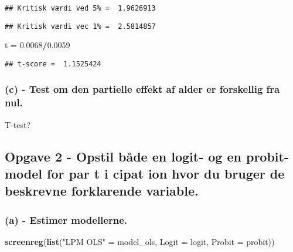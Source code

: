 \documentclass[
]{article}
\newenvironment{Shaded}{\begin{snugshade}}{\end{snugshade}}
\newcommand{\AttributeTok}[1]{\textcolor[rgb]{0.13,0.29,0.53}{#1}}
\newcommand{\FloatTok}[1]{\textcolor[rgb]{0.00,0.00,0.81}{#1}}
\newcommand{\FunctionTok}[1]{\textcolor[rgb]{0.13,0.29,0.53}{\textbf{#1}}}
\newcommand{\NormalTok}[1]{#1}
\newcommand{\OtherTok}[1]{\textcolor[rgb]{0.56,0.35,0.01}{#1}}
\newcommand{\SpecialCharTok}[1]{\textcolor[rgb]{0.81,0.36,0.00}{\textbf{#1}}}
\newcommand{\StringTok}[1]{\textcolor[rgb]{0.31,0.60,0.02}{#1}}
\begin{document}
\begin{verbatim}
## Kritisk værdi ved 5% =  1.9626913
\end{verbatim}

\begin{verbatim}
## Kritisk værdi vec 1% =  2.5814857
\end{verbatim}

\begin{Shaded}
\begin{Highlighting}[]
\NormalTok{t }\OtherTok{=} \FloatTok{0.0068}\SpecialCharTok{/}\FloatTok{0.0059}
\end{Highlighting}
\end{Shaded}

\begin{verbatim}
## t-score =  1.1525424
\end{verbatim}

\hypertarget{c---test-om-den-partielle-effekt-af-alder-er-forskellig-fra-nul.}{%
\subsubsection{(c) - Test om den partielle effekt af alder er forskellig
fra
nul.}\label{c---test-om-den-partielle-effekt-af-alder-er-forskellig-fra-nul.}}

T-test?

\hypertarget{opgave-2---opstil-buxe5de-en-logit--og-en-probit-model-for-par-t-i-cipat-ion-hvor-du-bruger-de-beskrevne-forklarende-variable.}{%
\subsection{Opgave 2 - Opstil både en logit- og en probit-model for par
t i cipat ion hvor du bruger de beskrevne forklarende
variable.}\label{opgave-2---opstil-buxe5de-en-logit--og-en-probit-model-for-par-t-i-cipat-ion-hvor-du-bruger-de-beskrevne-forklarende-variable.}}

\hypertarget{a---estimer-modellerne.}{%
\subsubsection{(a) - Estimer
modellerne.}\label{a---estimer-modellerne.}}

\begin{Shaded}
\begin{Highlighting}[]
\FunctionTok{screenreg}\NormalTok{(}\FunctionTok{list}\NormalTok{(}\StringTok{"LPM OLS"} \OtherTok{=}\NormalTok{ model\_ols, }\AttributeTok{Logit =}\NormalTok{ logit, }\AttributeTok{Probit =}\NormalTok{ probit))}
\end{Highlighting}
\end{Shaded}
\end{document}
